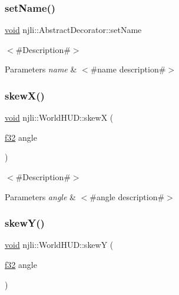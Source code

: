 \subsubsection{\texorpdfstring{set\+Name()}{setName()}}
{\footnotesize\ttfamily \mbox{\hyperlink{_thread_8h_af1e856da2e658414cb2456cb6f7ebc66}{void}} njli\+::\+Abstract\+Decorator\+::set\+Name}

$<$\#\+Description\#$>$


\begin{DoxyParams}{Parameters}
{\em name} & $<$\#name description\#$>$ \\
\hline
\end{DoxyParams}
\mbox{\label{classnjli_1_1_world_h_u_d_ab0a05d76b5251719b228fed812d69ff7}} 
\subsubsection{\texorpdfstring{skew\+X()}{skewX()}}
{\footnotesize\ttfamily \mbox{\hyperlink{_thread_8h_af1e856da2e658414cb2456cb6f7ebc66}{void}} njli\+::\+World\+H\+U\+D\+::skewX (\begin{DoxyParamCaption}\item[{\mbox{\hyperlink{_util_8h_a5f6906312a689f27d70e9d086649d3fd}{f32}}}]{angle }\end{DoxyParamCaption})}

$<$\#\+Description\#$>$


\begin{DoxyParams}{Parameters}
{\em angle} & $<$\#angle description\#$>$ \\
\hline
\end{DoxyParams}
\mbox{\label{classnjli_1_1_world_h_u_d_ac354c68e141696172bd0b1fc07d89f28}} 
\subsubsection{\texorpdfstring{skew\+Y()}{skewY()}}
{\footnotesize\ttfamily \mbox{\hyperlink{_thread_8h_af1e856da2e658414cb2456cb6f7ebc66}{void}} njli\+::\+World\+H\+U\+D\+::skewY (\begin{DoxyParamCaption}\item[{\mbox{\hyperlink{_util_8h_a5f6906312a689f27d70e9d086649d3fd}{f32}}}]{angle }\end{DoxyParamCaption})}

